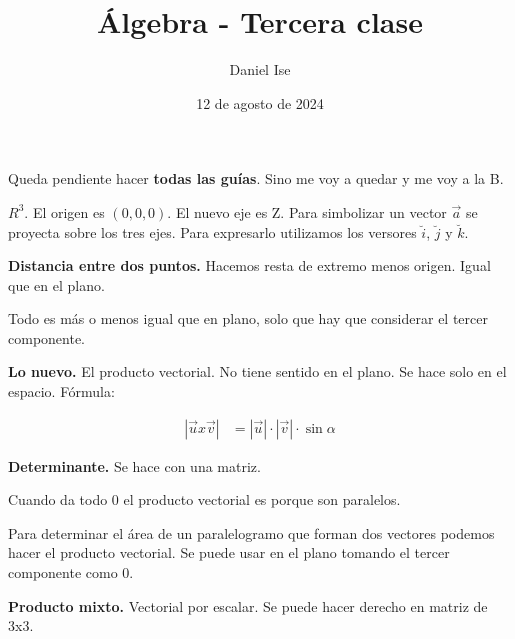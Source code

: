 \documentclass{article}
\title{Álgebra - Tercera clase}
\author{Daniel Ise}
\date{12 de agosto de 2024}
\begin{document}
\maketitle

Queda pendiente hacer \textbf{todas las guías}. Sino me voy a quedar y me voy a
la B.

\textbf{$R^3$}. El origen es $(0,0,0)$. El nuevo eje es Z. Para simbolizar un
vector $\vec{a}$ se proyecta sobre los tres ejes. Para expresarlo utilizamos los
versores $\breve{i}$, $\breve{j}$ y $\breve{k}$.

\textbf{Distancia entre dos puntos.} Hacemos resta de extremo menos origen.
Igual que en el plano.

Todo es más o menos igual que en plano, solo que hay que considerar el tercer
componente.

\textbf{Lo nuevo. }El producto vectorial. No tiene sentido en el plano. Se hace
solo en el espacio. Fórmula:

\begin{align*}
    |\vec{u}x\vec{v}| & = |\vec{u}| \cdot |\vec{v}| \cdot \sin\alpha
\end{align*}

\textbf{Determinante.} Se hace con una matriz.

Cuando da todo 0 el producto vectorial es porque son paralelos.

Para determinar el área de un paralelogramo que forman dos vectores podemos
hacer el producto vectorial. Se puede usar en el plano tomando el tercer 
componente como 0.

\textbf{Producto mixto.} Vectorial por escalar. Se puede hacer derecho en
matriz de 3x3.
\end{document}

